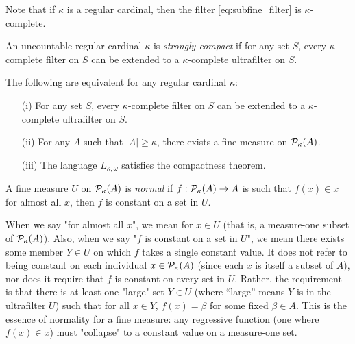 Note that if \( \kappa \) is a regular cardinal, then the filter \eqref{eq:subfine_filter} is \( \kappa \)-complete. 

\begin{definition}\label{def_strongly_compact_cardinal}
    An uncountable regular cardinal \( \kappa \) is \emph{strongly compact} if for any set \( S \), every \( \kappa \)-complete filter on \( S \) can be extended to a \( \kappa \)-complete ultrafilter on \( S \).
\end{definition}

\begin{lemma}
    The following are equivalent for any regular cardinal \( \kappa \):
    \begin{enumerate}
        \item[(i)] For any set \( S \), every \( \kappa \)-complete filter on \( S \) can be extended to a \( \kappa \)-complete ultrafilter on \( S \).
        \item[(ii)] For any \( A \) such that \( |A| \geq \kappa \), there exists a fine measure on \( \mathcal{P}_{\kappa}(A) \).
        \item[(iii)] The language \( L_{\kappa,\omega} \) satisfies the compactness theorem.
    \end{enumerate}
\end{lemma}

\begin{definition}\label{def_normal_measure}
    A fine measure $U$ on $\mathcal{P}_{\kappa}(A)$ is \textit{normal} if $f : \mathcal{P}_{\kappa}(A) \to A$ is such that $f(x) \in x$ for almost all $x$, then $f$ is constant on a set in $U$.
\end{definition}

When we say "for almost all $x$", we mean for $x \in U$ (that is, a measure-one subset of $\mathcal{P}_{\kappa}(A)$). Also, when we say "$f$ is constant on a set in $U$", we mean there exists some member $Y \in U$ on which $f$ takes a single constant value. It does not refer to being constant on each individual $x \in \mathcal{P}_\kappa(A)$ (since each $x$ is itself a subset of $A$), nor does it require that $f$ is constant on every set in $U$. Rather, the requirement is that there is at least one "large" set $Y \in U$ (where “large” means $Y$ is in the ultrafilter $U$) such that for all $x \in Y$, $f(x) = \beta$ for some fixed $\beta \in A$. This is the essence of normality for a fine measure: any regressive function (one where $f(x) \in x$) must "collapse" to a constant value on a measure-one set.

